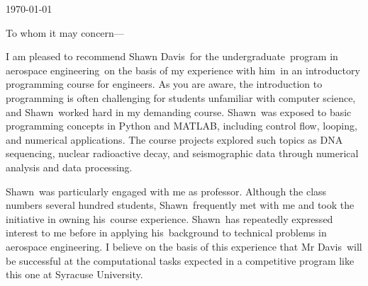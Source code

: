 \documentclass[10pt]{article}
\providecommand\studentname{Shawn Davis}
\providecommand\studentforename{Shawn}
\providecommand\studentsurname{Mr Davis}
\providecommand\studentstanding{undergraduate}
\providecommand\studentapplication{aerospace engineering}
\providecommand\studenttarget{Syracuse University}
\providecommand\xir{him}
\providecommand\xirs{his}
\begin{document}
\bigskip\bigskip\bigskip\bigskip
\bigskip\bigskip\bigskip\bigskip
\bigskip\bigskip\bigskip\bigskip
\bigskip\bigskip\bigskip\bigskip

\today
\bigskip

To whom it may concern---
\bigskip

I am pleased to recommend \studentname{}~for the \studentstanding{}~program in
\studentapplication{}~on the basis of my experience with \xir{}~in an
introductory programming course for engineers.  As you are aware, the
introduction to programming is often challenging for students unfamiliar with
computer science, and \studentforename{}~worked hard in my demanding course.
\studentforename{}~was exposed to basic programming concepts in Python and
MATLAB, including control flow, looping, and numerical applications.  The
course projects explored such topics as DNA sequencing, nuclear radioactive
decay, and seismographic data through numerical analysis and data processing.

\studentforename{}~was particularly engaged with me as professor.  Although the
class numbers several hundred students, \studentforename{}~frequently met with
me and took the initiative in owning \xirs{}~course experience.
\studentforename{}~has repeatedly expressed interest to me before in applying
\xirs{}~background to technical problems in \studentapplication{}.  I believe
on the basis of this experience that \studentsurname~will be successful at the
computational tasks expected in a competitive program like this one at
\studenttarget{}.
\end{document}
